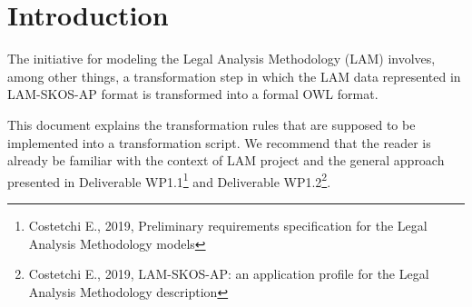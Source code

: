 \section{Introduction}\label{intro}

The initiative for modeling the Legal Analysis Methodology (LAM) involves, among other things, a transformation step in which the LAM data represented in LAM-SKOS-AP format is transformed into a formal OWL format. 

This document explains the transformation rules that are supposed to be implemented into a transformation script. We recommend that the reader is already be familiar with the context of LAM project and the general approach presented in Deliverable WP1.1\footnote{Costetchi E., 2019, Preliminary requirements specification for the Legal Analysis Methodology models} and Deliverable WP1.2\footnote{Costetchi E., 2019, LAM-SKOS-AP: an application profile for the Legal Analysis Methodology description}.
